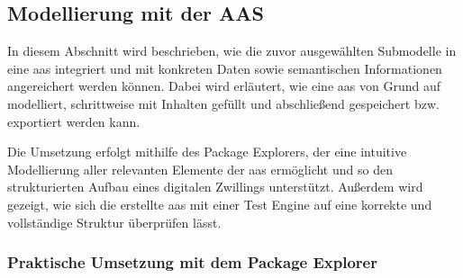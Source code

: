 


\subsection{Modellierung mit der AAS}
In diesem Abschnitt wird beschrieben, wie die zuvor ausgewählten Submodelle in eine \acs{aas} integriert und mit konkreten Daten sowie semantischen Informationen angereichert werden können.
Dabei wird erläutert, wie eine \acs{aas} von Grund auf modelliert, schrittweise mit Inhalten gefüllt und abschließend gespeichert bzw. exportiert werden kann.  

Die Umsetzung erfolgt mithilfe des Package Explorers, der eine intuitive Modellierung aller relevanten Elemente der \acs{aas} ermöglicht und so den strukturierten Aufbau eines digitalen Zwillings unterstützt.
Außerdem wird gezeigt, wie sich die erstellte \acs{aas} mit einer Test Engine auf eine korrekte und vollständige Struktur überprüfen lässt.

\subsubsection{Praktische Umsetzung mit dem Package Explorer}

